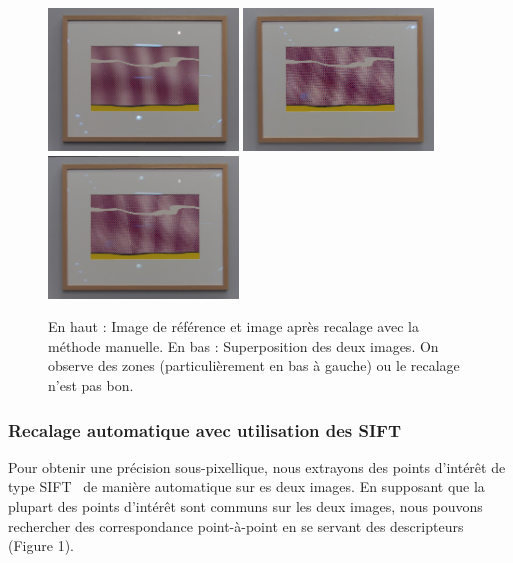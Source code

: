 \documentclass[12pt,a4paper]{article}
\begin{document}
\begin{figure}[H]
  \centering
  \includegraphics[width=0.45\textwidth]{Fig/User_reference.png}
  \includegraphics[width=0.45\textwidth]{Fig/User_fitted.png}\\ \vspace{0.1cm}
  \includegraphics[width=0.45\textwidth]{Fig/User_average.png}


  \caption{En haut : Image de référence et image après recalage avec la méthode manuelle. En bas : Superposition des deux images. On observe des zones (particulièrement en bas à gauche) ou le recalage n'est pas bon.}
\end{figure}

\subsubsection{Recalage automatique avec utilisation des  SIFT}

Pour obtenir une précision sous-pixellique, nous extrayons des points d'intérêt de type SIFT~\citep{lowe1999object} de manière automatique sur es deux images. En supposant que la plupart des points d'intérêt sont communs sur les deux images, nous pouvons rechercher des correspondance point-à-point en se servant des descripteurs (Figure 1). 
\end{document}

